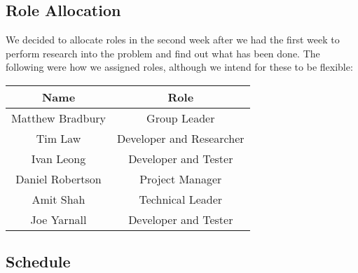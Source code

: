 \subsection{Role Allocation}

We decided to allocate roles in the second week after we had the first week to perform research into the problem and find out what has been done. The following were how we assigned roles, although we intend for these to be flexible:

\begin{table}[H]
\centering
	\begin{tabular}{| c | c |}
		\hline
		Name & Role\\
		\hline
		Matthew Bradbury & Group Leader\\
		Tim Law & Developer and Researcher\\
		Ivan Leong & Developer and Tester\\
		Daniel Robertson & Project Manager\\
		Amit Shah & Technical Leader\\
		Joe Yarnall & Developer and Tester\\
		\hline
	\end{tabular}
\end{table}


\subsection{Schedule}


